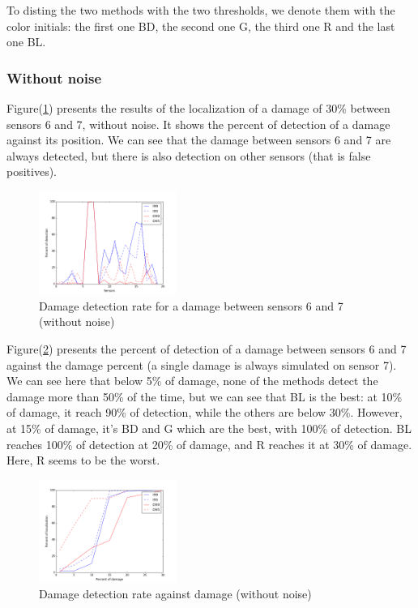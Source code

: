 \documentclass[journal]{IEEEtran}
\begin{document}
To disting the two methods with the two thresholds, we denote them with the color initials: the first one BD, the second one G, the third one R and the last one BL.

\subsubsection{Without noise}

Figure(\ref{damage30}) presents the results of the localization of a damage of 30\% between sensors 6 and 7, without noise.
It shows the percent of detection of a damage against its position.
We can see that the damage between sensors 6 and 7 are always detected, but there is also detection on other sensors (that is false positives).

\begin{figure}[h!]
  \centering
  \includegraphics[width=0.4\textwidth]{images/damage30percent.png}
  \caption{Damage detection rate for a damage between sensors 6 and 7 (without noise)}
  \label{damage30}
\end{figure}


Figure(\ref{detect}) presents the percent of detection of a damage between sensors 6 and 7 against the damage percent (a single damage is always simulated on sensor 7). We can see here that below 5\% of damage, none of the methods detect the damage more than 50\% of the time, but we can see that BL is the best: at 10\% of damage, it reach 90\% of detection, while the others are below 30\%. However, at 15\% of damage, it's BD and G which are the best, with 100\% of detection. BL reaches 100\% of detection at 20\% of damage, and R reaches it at 30\% of damage. Here, R seems to be the worst.

\begin{figure}[h!]
  \centering
  \includegraphics[width=0.4\textwidth]{images/detect.png}
  \caption{Damage detection rate against damage (without noise)}
  \label{detect}
\end{figure}
\end{document}
